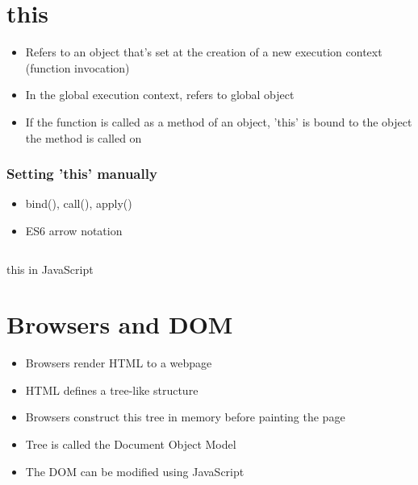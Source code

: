 \section{this}
\begin{itemize}
	\item Refers to an object that’s set at the creation of a new execution
	      context (function invocation)
	\item In the global execution context, refers to global object
	\item If the function is called as a method of an object, 'this' is
	      bound to the object the method is called on
\end{itemize}

\subsubsection{Setting 'this' manually}
\begin{itemize}
	\item bind(), call(), apply()
	\item ES6 arrow notation
\end{itemize}

\begin{code}
	\inputminted{js}{src1/e-this.js}
	\caption{this in JavaScript}
\end{code}

\section{Browsers and DOM}
\begin{itemize}
	\item Browsers render HTML to a webpage
	\item HTML defines a tree-like structure
	\item Browsers construct this tree in memory before painting the page
	\item Tree is called the Document Object Model
	\item The DOM can be modified using JavaScript
\end{itemize}